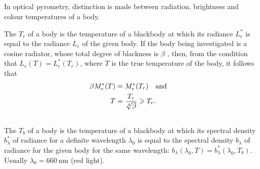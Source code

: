 \subsection{}\label{36.4.5} In optical pyrometry, distinction is made between radiation, brightness and colour temperatures of a body.

The  $T_{r}$ of a body is the temperature of a blackbody at which its radiance $L_{e}^{*}$ is equal to the radiance $L_{e}$ of the given body. If the body being investigated is a cosine radiator, whose total degree of blackness is $\beta$ , then,
from the condition that $L_{e} (T) = L_{e}^{*} (T_{r})$, where $T$ is the true temperature of the body, it follows that
\begin{align*}%
\beta M_{e}^{*} (T) & = M_{e}^{*} (T_{r}) \qand \\
T & = \frac{T_{r}}{\sqrt[4]{\beta}} \geqslant T_{r}.
\end{align*}

\subsection{}\label{36.4.6} The  $T_{b}$ of a body is the temperature of a blackbody at which its spectral density $b_{\lambda}^{*}$ of radiance for a definite wavelength $\lambda_{0}$ is equal to the spectral density $b_{\lambda}$ of radiance for the given body for the same wavelength: $b_{\lambda} (\lambda_{0}, T) = b_{\lambda}^{*}(\lambda_{0}, T_{b})$. Usually $\lambda_{0} =   \SI{660}{\nano\meter}$ (red light).

